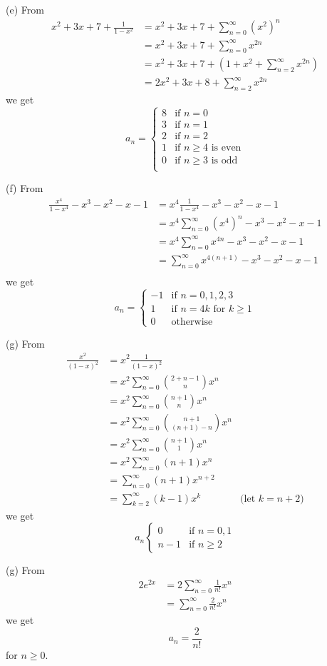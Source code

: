 (e)
From
\begin{align*}
  x^2 + 3x + 7 + \frac{1}{1 - x^2}
  &= x^2 + 3x + 7 + \sum_{n=0}^\infty (x^2)^n \\
  &= x^2 + 3x + 7 + \sum_{n=0}^\infty x^{2n} \\
  &= x^2 + 3x + 7 + \left(1 + x^2 + \sum_{n=2}^\infty x^{2n} \right) \\
  &= 2x^2 + 3x + 8 + \sum_{n=2}^\infty x^{2n} 
\end{align*}
we get
\[
a_n =
\begin{cases}
  8 & \text{if $n = 0$} \\
  3 & \text{if $n = 1$} \\
  2 & \text{if $n = 2$} \\
  1 & \text{if $n \geq 4$ is even} \\
  0 & \text{if $n \geq 3$ is odd} \\
\end{cases}
\]


(f)
From
\begin{align*}
  \frac{x^4}{1 - x^4} - x^3 - x^2 - x - 1
  &= x^4 \frac{1}{1 - x^4} - x^3 - x^2 - x - 1 \\
  &= x^4 \sum_{n=0}^\infty (x^4)^n - x^3 - x^2 - x - 1 \\
  &= x^4 \sum_{n=0}^\infty x^{4n} - x^3 - x^2 - x - 1 \\
  &= \sum_{n=0}^\infty x^{4(n + 1)} - x^3 - x^2 - x - 1 \\
\end{align*}
we get
\[
a_n =
\begin{cases}
  -1 & \text{if $n = 0,1,2,3$} \\
  1 & \text{if $n = 4k$ for $k\geq 1$} \\
  0 & \text{otherwise}
\end{cases}
\]

(g)
From
\begin{align*}
  \frac{x^2}{(1 - x)^2} &= x^2 \frac{1}{(1 - x)^2} \\
  &= x^2 \sum_{n=0}^\infty \binom{2 + n - 1}{n} x^n \\
  &= x^2 \sum_{n=0}^\infty \binom{n + 1}{n} x^n \\
  &= x^2 \sum_{n=0}^\infty \binom{n + 1}{(n + 1) - n} x^n \\
  &= x^2 \sum_{n=0}^\infty \binom{n + 1}{1} x^n \\
  &= x^2 \sum_{n=0}^\infty (n + 1) x^n \\
  &= \sum_{n=0}^\infty (n + 1) x^{n+2} \\
  &= \sum_{k=2}^\infty (k - 1) x^{k} & \text{(let $k = n + 2$)}
\end{align*}
we get
\[
a_n
\begin{cases}
  0 & \text{if } n = 0,1 \\
  n-1 & \text{if } n \geq 2 
\end{cases}
\]


(g)
From
\begin{align*}
  2e^{2x} &= 2 \sum_{n=0}^\infty \frac{1}{n!} x^n \\
         &= \sum_{n=0}^\infty \frac{2}{n!} x^n 
\end{align*}
we get
\[
a_n = \frac{2}{n!}
\]
for $n \geq 0$.
